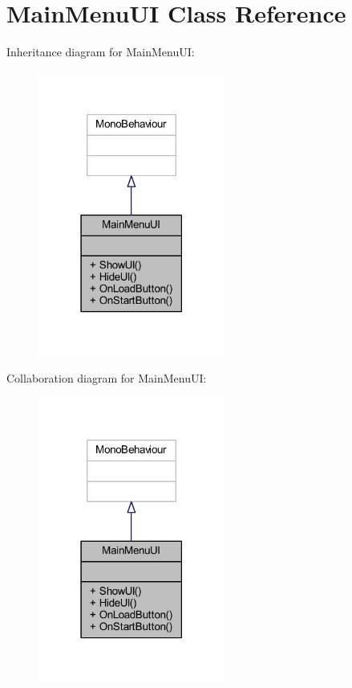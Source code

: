 \hypertarget{class_main_menu_u_i}{}\section{Main\+Menu\+UI Class Reference}
\label{class_main_menu_u_i}


Inheritance diagram for Main\+Menu\+UI\+:
\nopagebreak
\begin{figure}[H]
\begin{center}
\leavevmode
\includegraphics[width=174pt]{class_main_menu_u_i__inherit__graph}
\end{center}
\end{figure}


Collaboration diagram for Main\+Menu\+UI\+:
\nopagebreak
\begin{figure}[H]
\begin{center}
\leavevmode
\includegraphics[width=174pt]{class_main_menu_u_i__coll__graph}
\end{center}
\end{figure}
